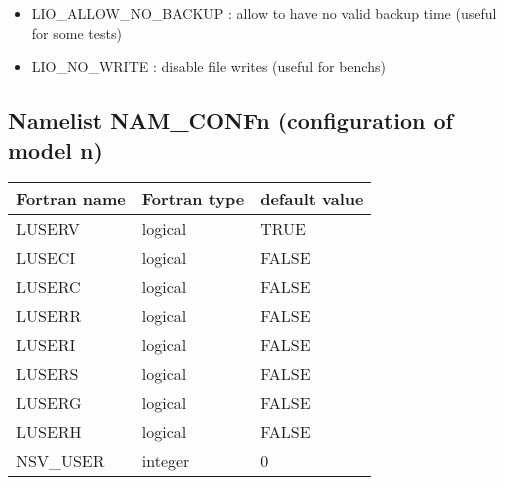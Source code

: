 \begin{itemize}

\item
LIO\_ALLOW\_NO\_BACKUP : allow to have no valid backup time (useful for some tests)

\item
LIO\_NO\_WRITE : disable file writes (useful for benchs)

\end{itemize}


\subsection{Namelist NAM\_CONFn (configuration of model n)}

\begin{center}
\begin{tabular} {|l|l|l|}
\hline
Fortran name & Fortran type & default value \\
\hline
LUSERV   & logical & TRUE  \\
LUSECI   & logical  & FALSE  \\
LUSERC   & logical  & FALSE  \\
LUSERR   & logical  & FALSE  \\
LUSERI   & logical  & FALSE  \\
LUSERS   & logical  & FALSE  \\
LUSERG   & logical  & FALSE  \\
LUSERH   & logical  & FALSE  \\
NSV\_USER & integer  & 0\\
\hline
\end{tabular}
\end{center}


